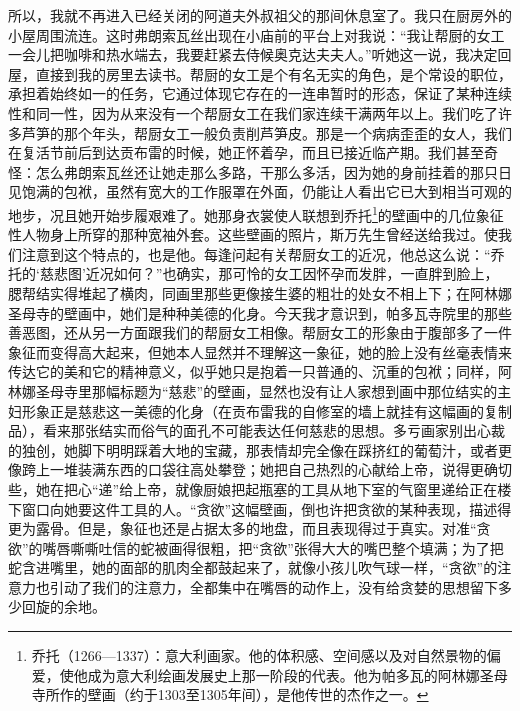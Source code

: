 \par 所以，我就不再进入已经关闭的阿道夫外叔祖父的那间休息室了。我只在厨房外的小屋周围流连。这时弗朗索瓦丝出现在小庙前的平台上对我说：“我让帮厨的女工一会儿把咖啡和热水端去，我要赶紧去侍候奥克达夫夫人。”听她这一说，我决定回屋，直接到我的房里去读书。帮厨的女工是个有名无实的角色，是个常设的职位，承担着始终如一的任务，它通过体现它存在的一连串暂时的形态，保证了某种连续性和同一性，因为从来没有一个帮厨女工在我们家连续干满两年以上。我们吃了许多芦笋的那个年头，帮厨女工一般负责削芦笋皮。那是一个病病歪歪的女人，我们在复活节前后到达贡布雷的时候，她正怀着孕，而且已接近临产期。我们甚至奇怪：怎么弗朗索瓦丝还让她走那么多路，干那么多活，因为她的身前挂着的那只日见饱满的包袱，虽然有宽大的工作服罩在外面，仍能让人看出它已大到相当可观的地步，况且她开始步履艰难了。她那身衣裳使人联想到乔托\footnote{乔托（1266—1337）：意大利画家。他的体积感、空间感以及对自然景物的偏爱，使他成为意大利绘画发展史上那一阶段的代表。他为帕多瓦的阿林娜圣母寺所作的壁画（约于1303至1305年间），是他传世的杰作之一。}的壁画中的几位象征性人物身上所穿的那种宽袖外套。这些壁画的照片，斯万先生曾经送给我过。使我们注意到这个特点的，也是他。每逢问起有关帮厨女工的近况，他总这么说：“乔托的‘慈悲图’近况如何？”也确实，那可怜的女工因怀孕而发胖，一直胖到脸上，腮帮结实得堆起了横肉，同画里那些更像接生婆的粗壮的处女不相上下；在阿林娜圣母寺的壁画中，她们是种种美德的化身。今天我才意识到，帕多瓦寺院里的那些善恶图，还从另一方面跟我们的帮厨女工相像。帮厨女工的形象由于腹部多了一件象征而变得高大起来，但她本人显然并不理解这一象征，她的脸上没有丝毫表情来传达它的美和它的精神意义，似乎她只是抱着一只普通的、沉重的包袱；同样，阿林娜圣母寺里那幅标题为“慈悲”的壁画，显然也没有让人家想到画中那位结实的主妇形象正是慈悲这一美德的化身（在贡布雷我的自修室的墙上就挂有这幅画的复制品），看来那张结实而俗气的面孔不可能表达任何慈悲的思想。多亏画家别出心裁的独创，她脚下明明踩着大地的宝藏，那表情却完全像在踩挤红的葡萄汁，或者更像跨上一堆装满东西的口袋往高处攀登；她把自己热烈的心献给上帝，说得更确切些，她在把心“递”给上帝，就像厨娘把起瓶塞的工具从地下室的气窗里递给正在楼下窗口向她要这件工具的人。“贪欲”这幅壁画，倒也许把贪欲的某种表现，描述得更为露骨。但是，象征也还是占据太多的地盘，而且表现得过于真实。对准“贪欲”的嘴唇嘶嘶吐信的蛇被画得很粗，把“贪欲”张得大大的嘴巴整个填满；为了把蛇含进嘴里，她的面部的肌肉全都鼓起来了，就像小孩儿吹气球一样，“贪欲”的注意力也引动了我们的注意力，全都集中在嘴唇的动作上，没有给贪婪的思想留下多少回旋的余地。
